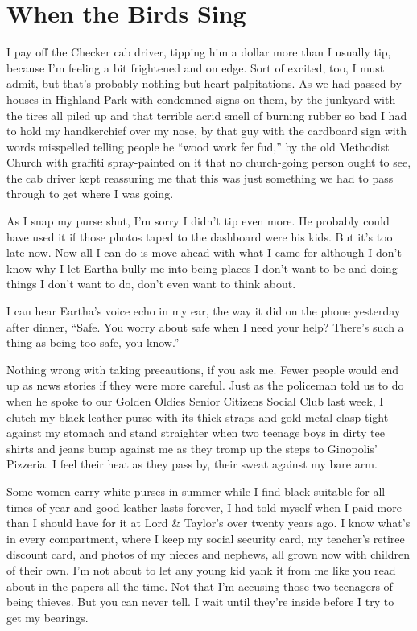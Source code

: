 \documentclass[twoside,10pt]{book}
\begin{document}
\cleardoublepage
\chapter{When the Birds Sing}

I pay off the Checker cab driver, tipping him a dollar more than I
usually tip, because I'm feel­ing a bit frightened and on edge. Sort of
excited, too, I must admit, but that's probably nothing but heart
palpitations. As we had passed by houses in Highland Park with condemned
signs on them, by the junkyard with the tires all piled up and that
terrible acrid smell of burning rubber so bad I had to hold my
handkerchief over my nose, by that guy with the cardboard sign with
words misspelled telling people he ``wood work fer fud,'' by the old
Methodist Church with graffiti spray-painted on it that no church-going
person ought to see, the cab driver kept reassuring me that this was
just something we had to pass through to get where I was going.

As I snap my purse shut, I'm sorry I didn't tip even more. He probably
could have used it if those photos taped to the dashboard were his kids.
But it's too late now. Now all I can do is move ahead with what I came
for although I don't know why I let Eartha bully me into being places I
don't want to be and doing things I don't want to do, don't even want to
think about.

I can hear Eartha's voice echo in my ear, the way it did on the phone
yesterday after dinner, ``Safe. You worry about safe when I need your
help? There's such a thing as being too safe, you know.''

Nothing wrong with taking precautions, if you ask me. Fewer people would
end up as news stories if they were more careful. Just as the policeman
told us to do when he spoke to our Golden Oldies Senior Citizens Social
Club last week, I clutch my black leather purse with its thick straps
and gold metal clasp tight against my stomach and stand straighter when
two teenage boys in dirty tee shirts and jeans bump against me as they
tromp up the steps to Ginopolis' Pizzeria. I feel their heat as they
pass by, their sweat against my bare arm.

Some women carry white purses in summer while I find black suitable for
all times of year and good leather lasts forever, I had told myself when
I paid more than I should have for it at Lord \& Taylor's over twenty
years ago. I know what's in every compartment, where I keep my social
security card, my teacher's retiree discount card, and photos of my
nieces and nephews, all grown now with children of their own. I'm not
about to let any young kid yank it from me like you read about in the
papers all the time. Not that I'm accusing those two teenagers of being
thieves. But you can never tell. I wait until they're inside before I
try to get my bearings.
\end{document}
